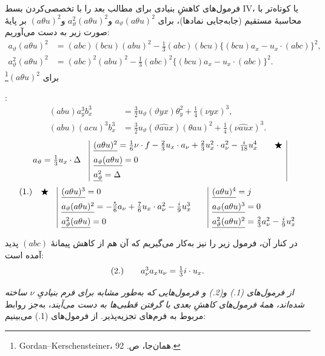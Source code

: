 \documentclass[11pt]{article}
\newcommand{\srcLTR}[1]{\relax\ifmmode\text{\mbox{\babelsublr{\foreignlanguage{english}{#1}}}}\else\babelsublr{\foreignlanguage{english}{#1}}\fi}
\newcommand{\srcfn}[2]{\begingroup\renewcommand{\thefootnote}{\srcLTR{#1}}\footnote{#2}\addtocounter{footnote}{-1}\endgroup}
\begin{document}
فرمول‌های کاهشِ بنیادی برای مطالب بعد را با تخصصی‌کردن بسط IV، یا کوتاه‌تر با محاسبهٔ مستقیم (جابه‌جایی نمادها)، برای $a_\vartheta(a\theta u)^2$ و$a_\vartheta^2(a\theta u)^2$ و$(a\theta u)^2$ بر پایهٔ صورت زیر به دست می‌آوریم:
\[
\begin{aligned}
a_\vartheta(a\theta u)^2
&=(abc)(bcu)(abu)^2-\frac13(abc)(bcu)\{(bcu)a_x-u_x\cdot(abc)\}^2,\\
a_\vartheta^2(a\theta u)^2
&=(abc)^2(abu)^2-\frac13(abc)^2\{(bcu)a_x-u_x\cdot(abc)\}^2.
\end{aligned}
\]
برای $(a\theta u)^2$\srcfn{*)}{Gordan--Kerschensteiner، همان‌جا، ص. 92.}:
\[
\begin{aligned}
(abu)a_y^3b_x^3&=\frac32u_\vartheta(\vartheta yx)\theta_y^2+\frac14(\nu yx)^3,\\
(abu)(acu)^3b_x^3&=\frac32u_\vartheta(\vartheta\widehat{au}x)(\theta au)^2+\frac14(\nu\widehat{au}x)^3.
\end{aligned}
\]
\begingroup\small
\[
\begin{array}{r@{\quad}|l@{\qquad}c|}
& \underline{(a\theta u)^2}=\frac16\nu\cdot f-\frac23u_x\cdot a_\nu+\frac23u_x^2\cdot a_\nu^2-\frac{i}{18}u_x^4
& \bigstar\\[0.55em]
a_\vartheta=\frac13u_x\cdot\Delta
& \underline{a_\vartheta(a\theta u)}=0
& \\[0.55em]
& \underline{a_\vartheta^2}=\Delta
&
\end{array}
\]
\vspace{-0.5em}
\[
\begin{array}{r@{\quad}c@{\quad}|l@{\qquad}|l}
(1.) & \bigstar
& \underline{(a\theta u)^3}=0
& \underline{(a\theta u)^4}=j\\[0.55em]
&
& \underline{a_\vartheta(a\theta u)^2}=-\frac56a_\nu+\frac76u_x\cdot a_\nu^2-\frac{i}{9}u_x^3
& \underline{a_\vartheta(a\theta u)^3}=0\\[0.55em]
&
& \underline{a_\vartheta^2(a\theta u)}=0
& \underline{a_\vartheta^2(a\theta u)^2}=\frac23a_\nu^2-\frac{i}{9}u_x^2
\end{array}
\]
\endgroup

در کنار آن، فرمول زیر را نیز به‌کار می‌گیریم که آن هم از کاهش پیمانهٔ $(abc)$ پدید آمده است:
\[
\begin{array}{r@{\qquad}l}
(2.) & a_\nu^3a_xu_\nu=\frac13i\cdot u_x.
\end{array}
\]

\emph{از فرمول‌های (1.) و(2.) و فرمول‌هایی که به‌طور مشابه برای فرم بنیادیِ $\nu$ ساخته شده‌اند، همهٔ فرمول‌های کاهشِ بعدی با گرفتن قطبی‌ها به دست می‌آیند}، به‌جز روابط مربوط به فرم‌های تجزیه‌پذیر. از فرمول‌های (1.) می‌بینیم:
\end{document}
